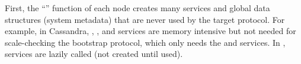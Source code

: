 %
First, the ``'' function of each node creates many services and
global data structures (system metadata) that are never used by the target
protocol.  For example, in Cassandra, , , and
 services are memory intensive but not needed for
scale-checking the bootstrap protocol, which only needs the 
and  services.  In \sck, services are lazily called (not
created until used).
\fi

